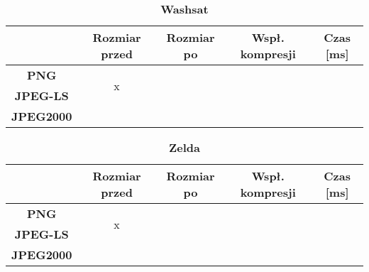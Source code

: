 \begin{table}[!h]
	\centering
	\caption{\textbf{Washsat}}
	\label{my-label}
	\begin{tabular}{|c|c|c|c|c|}                                             
		\hline
		& \textbf{Rozmiar przed} & \textbf{Rozmiar po} & \textbf{Wspł. kompresji} & \textbf{Czas {[}ms{]}} \\ \hline 
		\textbf{PNG}      &          \multicolumn{1}{c|}{\multirow{2}{*}{x}}             &                     &                          &                             \\\cline{3-5}
		\textbf{JPEG-LS}  &                        &                     &                          &                          \\\cline{3-5}
		\textbf{JPEG2000} &                        &                     &                          &                      \\ \hline
	\end{tabular}
\end{table}

\begin{table}[!h]
	\centering
	\caption{\textbf{Zelda}}
	\label{my-label}
	\begin{tabular}{|c|c|c|c|c|}                                             
		\hline
		& \textbf{Rozmiar przed} & \textbf{Rozmiar po} & \textbf{Wspł. kompresji} & \textbf{Czas {[}ms{]}} \\ \hline 
		\textbf{PNG}      &          \multicolumn{1}{c|}{\multirow{2}{*}{x}}             &                     &                          &                             \\\cline{3-5}
		\textbf{JPEG-LS}  &                        &                     &                          &                          \\\cline{3-5}
		\textbf{JPEG2000} &                        &                     &                          &                      \\ \hline
	\end{tabular}
\end{table}
